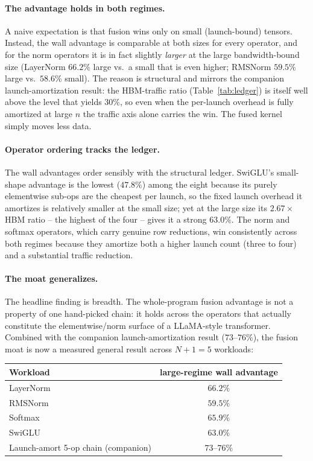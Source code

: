 \documentclass[11pt,a4paper]{article}
\begin{document}
\paragraph{The advantage holds in both regimes.} A naive expectation is that
fusion wins only on small (launch-bound) tensors. Instead, the wall advantage
is comparable at both sizes for every operator, and for the norm operators it is
in fact slightly \emph{larger} at the large bandwidth-bound size
(LayerNorm $66.2\%$ large vs.\ a small that is even higher; RMSNorm
$59.5\%$ large vs.\ $58.6\%$ small). The reason is structural and mirrors the
companion launch-amortization result: the HBM-traffic ratio (Table~\ref{tab:ledger})
is itself well above the level that yields $30\%$, so even when the per-launch
overhead is fully amortized at large $n$ the traffic axis alone carries the win.
The fused kernel simply moves less data.

\paragraph{Operator ordering tracks the ledger.} The wall advantages order
sensibly with the structural ledger. SwiGLU's small-shape advantage is the
lowest ($47.8\%$) among the eight because its purely elementwise sub-ops are the
cheapest per launch, so the fixed launch overhead it amortizes is relatively
smaller at the small size; yet at the large size its $2.67\times$ HBM ratio --
the highest of the four -- gives it a strong $63.0\%$. The norm and softmax
operators, which carry genuine row reductions, win consistently across both
regimes because they amortize both a higher launch count (three to four) and a
substantial traffic reduction.

\paragraph{The moat generalizes.} The headline finding is breadth. The
whole-program fusion advantage is not a property of one hand-picked chain: it
holds across the operators that actually constitute the elementwise/norm surface
of a LLaMA-style transformer. Combined with the companion launch-amortization
result ($73$--$76\%$), the fusion moat is now a measured general result across
$N+1 = 5$ workloads:

\begin{center}
\begin{tabular}{lc}
\toprule
Workload & large-regime wall advantage \\
\midrule
LayerNorm & $66.2\%$ \\
RMSNorm & $59.5\%$ \\
Softmax & $65.9\%$ \\
SwiGLU & $63.0\%$ \\
Launch-amort 5-op chain (companion) & $73$--$76\%$ \\
\bottomrule
\end{tabular}
\end{center}
\end{document}
